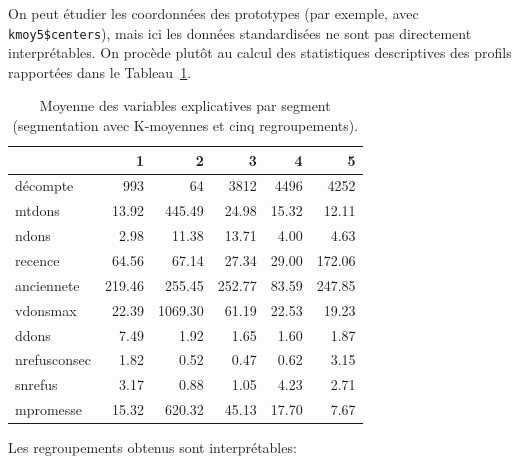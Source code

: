 \documentclass[
  11pt,
  letterpaper,
]{scrbook}
\newenvironment{Shaded}{\begin{snugshade}}{\end{snugshade}}
\newcommand{\AttributeTok}[1]{\textcolor[rgb]{0.40,0.45,0.13}{#1}}
\newcommand{\FunctionTok}[1]{\textcolor[rgb]{0.28,0.35,0.67}{#1}}
\newcommand{\NormalTok}[1]{\textcolor[rgb]{0.00,0.23,0.31}{#1}}
\newcommand{\SpecialCharTok}[1]{\textcolor[rgb]{0.37,0.37,0.37}{#1}}
\theoremstyle{definition}
\theoremstyle{remark}
\begin{document}
On peut étudier les coordonnées des prototypes (par exemple, avec
\texttt{kmoy5\$centers}), mais ici les données standardisées ne sont pas
directement interprétables. On procède plutôt au calcul des statistiques
descriptives des profils rapportées dans le
Tableau~\ref{tbl-kmoy5resume}.

\begin{Shaded}
\end{Shaded}

\hypertarget{tbl-kmoy5resume}{}
\begin{table}
\caption{\label{tbl-kmoy5resume}Moyenne des variables explicatives par segment (segmentation avec
K-moyennes et cinq regroupements). }\tabularnewline

\centering
\begin{tabular}{l|r|r|r|r|r}
\hline
  & 1 & 2 & 3 & 4 & 5\\
\hline
décompte & 993 & 64 & 3812 & 4496 & 4252\\
\hline
mtdons & 13.92 & 445.49 & 24.98 & 15.32 & 12.11\\
\hline
ndons & 2.98 & 11.38 & 13.71 & 4.00 & 4.63\\
\hline
recence & 64.56 & 67.14 & 27.34 & 29.00 & 172.06\\
\hline
anciennete & 219.46 & 255.45 & 252.77 & 83.59 & 247.85\\
\hline
vdonsmax & 22.39 & 1069.30 & 61.19 & 22.53 & 19.23\\
\hline
ddons & 7.49 & 1.92 & 1.65 & 1.60 & 1.87\\
\hline
nrefusconsec & 1.82 & 0.52 & 0.47 & 0.62 & 3.15\\
\hline
snrefus & 3.17 & 0.88 & 1.05 & 4.23 & 2.71\\
\hline
mpromesse & 15.32 & 620.32 & 45.13 & 17.70 & 7.67\\
\hline
\end{tabular}
\end{table}

Les regroupements obtenus sont interprétables:
\end{document}
